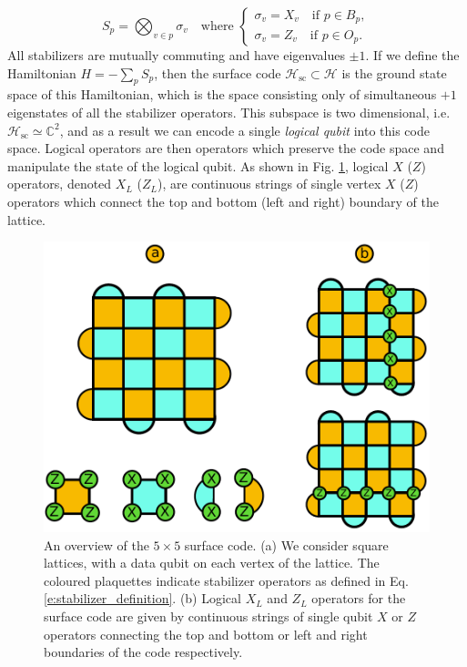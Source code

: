 \documentclass[twocolumn,preprintnumbers,amsmath,amssymb,notitlepage,nofootinbib,longbibliography,superscriptaddress,aps,pra,10pt]{revtex4-1}
\begin{document}
        \begin{equation}\label{e:stabilizer_definition}
            S_p = \bigotimes_{v\in p} \sigma_v \quad \text{where   }   \begin{cases}
                                                                        \sigma_v = X_v \quad \text{if } p \in B_p,\\
                                                                         \sigma_v = Z_v \quad \text{if } p \in O_p.
                                                                     \end{cases}
        \end{equation}
        All stabilizers are mutually commuting and have eigenvalues $\pm 1$.
        If we define the Hamiltonian $H = -\sum_p S_p$, then the surface code $\mathcal{H}_\mathrm{sc} \subset \mathcal{H}$ is the ground state space of this Hamiltonian, which is the space consisting only of simultaneous $+1$ eigenstates of all the stabilizer operators. 
        This subspace is two dimensional, i.e. $\mathcal{H}_\mathrm{sc} \simeq \mathbb{C}^2$, and as a result we can encode a single \textit{logical qubit} into this code space.
        Logical operators are then operators which preserve the code space and manipulate the state of the logical qubit. As shown in Fig. \ref{f:surface_code}, logical $X$ ($Z$) operators, denoted $X_L$ ($Z_L$), are continuous strings of single vertex $X$ ($Z$) operators which connect the top and bottom (left and right) boundary of the lattice.


        \begin{figure}
            \centering
            \includegraphics[width=0.8\linewidth]{surface_code2.pdf}
            \caption{An overview of the $5 \times 5$ surface code. (a) We consider square lattices, with a data qubit on each vertex of the lattice. The coloured plaquettes indicate stabilizer operators as defined in Eq. \eqref{e:stabilizer_definition}. (b) Logical $X_L$ and $Z_L$ operators for the surface code are given by continuous strings of single qubit $X$ or $Z$ operators connecting the top and bottom or left and right boundaries of the code respectively.}\label{f:surface_code}
        \end{figure}
\end{document}

